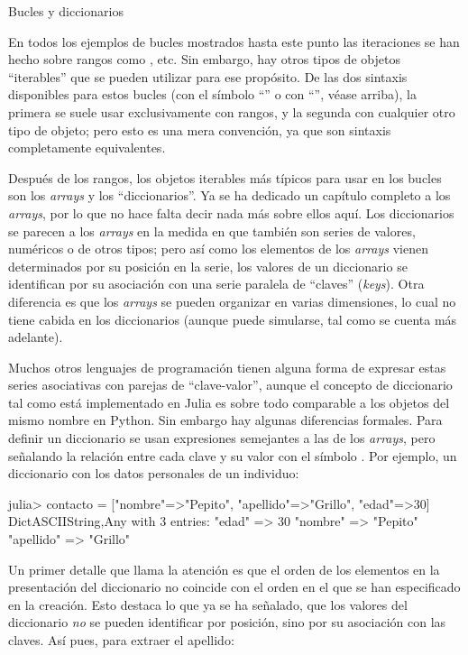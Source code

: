 ﻿\documentclass[spanish]{article}
\begin{document}
Bucles y diccionarios

En todos los ejemplos de bucles  mostrados hasta este punto
las iteraciones se han hecho sobre rangos como , etc.
Sin embargo, hay otros tipos de objetos ``iterables'' que se pueden
utilizar para ese propósito. De las dos sintaxis disponibles para estos
bucles (con el símbolo ``\code{=}'' o con ``'', véase arriba),
la primera se suele usar exclusivamente con rangos, y la segunda con
cualquier otro tipo de objeto; pero esto es una mera convención, ya
que son sintaxis completamente equivalentes.

Después de los rangos, los objetos iterables más típicos para usar
en los bucles  son los \emph{arrays} y los ``diccionarios''.
Ya se ha dedicado un capítulo completo a los \emph{arrays}, por lo que
no hace falta decir nada más sobre ellos aquí.
Los diccionarios se parecen a los \emph{arrays} en la medida en que
también son series de valores, numéricos o de otros tipos;
pero así como los elementos de los \emph{arrays} vienen determinados por su
posición en la serie, los valores de un diccionario se identifican por
su asociación con una serie paralela de ``claves'' (\emph{keys}).
Otra diferencia es que los \emph{arrays} se pueden organizar en varias
dimensiones, lo cual no tiene cabida en los diccionarios (aunque puede simularse,
tal como se cuenta más adelante).

Muchos otros lenguajes de programación tienen alguna forma de expresar estas
series asociativas con parejas de ``clave-valor'', aunque el concepto de
diccionario tal como está implementado en Julia es sobre todo comparable
a los objetos del mismo nombre en Python. Sin embargo hay algunas diferencias
formales. Para definir un diccionario se usan expresiones semejantes a las de
los \emph{arrays}, pero señalando la relación entre cada clave y su valor
con el símbolo \code{=>}. Por ejemplo, un diccionario con los datos personales
de un individuo:

julia> contacto = ["nombre"=>"Pepito", "apellido"=>"Grillo", "edad"=>30]
Dict{ASCIIString,Any} with 3 entries:
  "edad"     => 30
  "nombre"   => "Pepito"
  "apellido" => "Grillo"

Un primer detalle que llama la atención es que el orden de los elementos
en la presentación del diccionario no coincide con el orden en el que se han
especificado en la creación. Esto destaca lo que ya se ha señalado, que los
valores del diccionario \emph{no} se pueden identificar por posición, sino
por su asociación con las claves. Así pues, para extraer el apellido:
\end{document}

